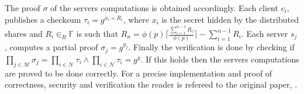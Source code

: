 The proof $\sigma$ of the servers computations is obtained accordingly.  Each client $c_i$, publishes a checksum $\tau_i= g^{x_i+R_i}$, where $x_i$ is the secret hidden by the distributed shares and $R_i\in_R\mathds{F}$ is such that $R_n=\phi(p) \lceil \frac{\sum_{i=1}^{n-1}R_i}{\phi(p)}\rceil - \sum_{i=1}^{n-1}R_i $. Each server $s_j$, computes a partial proof $\sigma_j = g^{y_j}$.  Finally the verification is done by checking if $\prod_{j\in\mathcal{M}} \sigma_j = \prod_{i\in\mathcal{N}}\tau_i\wedge \prod_{i\in\mathcal{N}}\tau_i = g^y$.  If this holds then the servers computations are proved to be done correctly. For a precise implementation and proof of correctness, security and verification the reader is refereed to the original paper, \cite{SumItUp}.
\begin{comment}





\end{comment}
